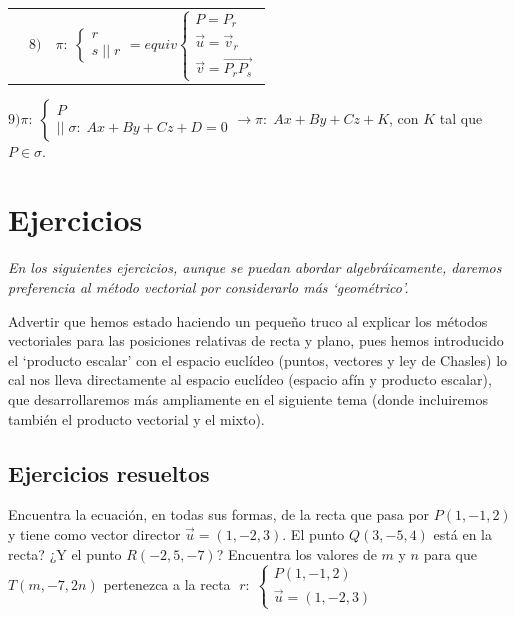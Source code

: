 \begin{table}[H]
\begin{tabular}{ll}
 & 
$8)\quad  \pi:\; \begin{cases} r \\ s\;||\;r\end{cases}= equiv \begin{cases} P=P_r \\ \vec u=\vec v_r \\ \vec v=\overrightarrow{P_rP_s} \end{cases}$ 
\end{tabular}
\end{table}
\vspace{-5mm} \noindent \scriptsize{$9) \pi: \;\begin{cases} P \\ ||\; \sigma:\; Ax+By+Cz+D=0 \end{cases}\to \pi: \; Ax+By+Cz+K$, con $K$ tal que $P\in \sigma$}\normalsize{.}
\section{Ejercicios}

\textit{En los siguientes ejercicios, aunque se puedan abordar algebráicamente, daremos preferencia al método vectorial por considerarlo más `geométrico'.}

Advertir que hemos estado haciendo un pequeño truco al explicar los métodos vectoriales para las posiciones relativas de recta y plano, pues hemos introducido el `producto escalar' con el espacio euclídeo (puntos, vectores y ley de Chasles) lo cal nos lleva directamente al espacio euclídeo (espacio afín y producto escalar), que desarrollaremos más ampliamente en el siguiente tema (donde incluiremos también el producto vectorial y el mixto).

\subsection{Ejercicios resueltos}

\begin{ejre}
	Encuentra la ecuación, en todas sus formas, de la recta que pasa por $P(1,-1,2)$ y tiene como vector director $\vec u=(1,-2,3)$. El punto $Q(3,-5,4)$ está en la recta? ¿Y el punto $R(-2,5,-7)$? Encuentra los valores de $m$ y $n$ para que $T(m,-7,2n)$ pertenezca a la recta
	$\; r:\; \begin{cases} P(1,-1,2)\\ \vec u=(1,-2,3) \end{cases}$ 
\end{ejre}

